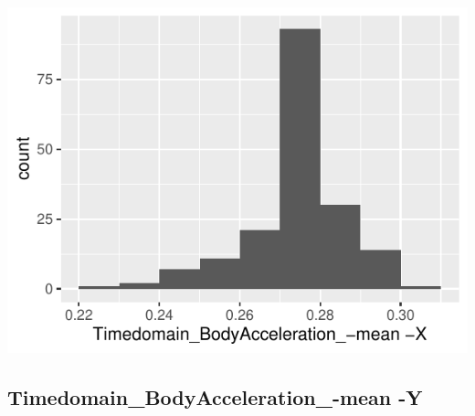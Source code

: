 \documentclass[
]{article}
\begin{document}
\begin{minipage}{0.25 \textwidth}

\includegraphics{codebook_tidydatasub_files/figure-latex/Var-3-Timedomain-BodyAcceleration--mean--X-1.pdf}

\end{minipage}

\noindent\makebox[\linewidth]{\rule{\textwidth}{0.4pt}}

\hypertarget{timedomain_bodyacceleration_-mean--y}{%
\subsection{Timedomain\_BodyAcceleration\_-mean
-Y}\label{timedomain_bodyacceleration_-mean--y}}
\end{document}
